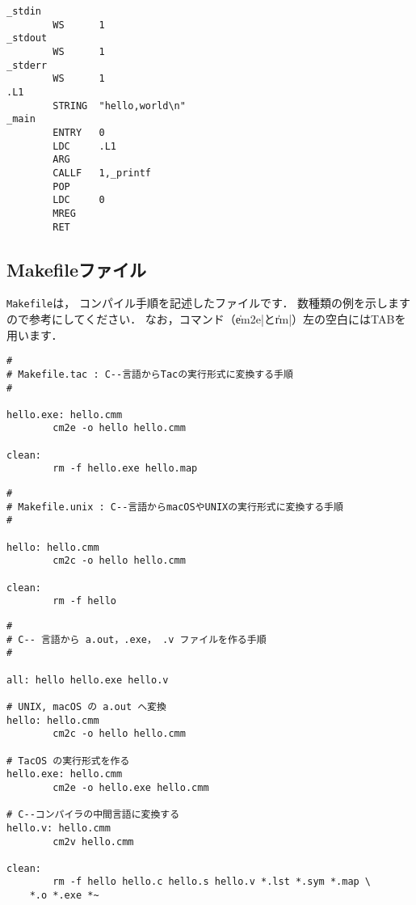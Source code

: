\begin{itemize}
\begin{mylist}
\begin{verbatim}
_stdin
        WS      1
_stdout
        WS      1
_stderr
        WS      1
.L1
        STRING  "hello,world\n"
_main
        ENTRY   0
        LDC     .L1
        ARG
        CALLF   1,_printf
        POP
        LDC     0
        MREG
        RET
\end{verbatim}
\end{mylist}
\end{itemize}

\subsection{Makefileファイル}

{\tt Makefile}は，
コンパイル手順を記述したファイルです．
数種類の例を示しますので参考にしてください．
なお，コマンド（\|em2e|と\|rm|）左の空白にはTABを用います．

\begin{mylist}
\begin{verbatim}
#
# Makefile.tac : C--言語からTacの実行形式に変換する手順
#

hello.exe: hello.cmm
        cm2e -o hello hello.cmm

clean:
        rm -f hello.exe hello.map
\end{verbatim}
\end{mylist}

\begin{mylist}
\begin{verbatim}
#
# Makefile.unix : C--言語からmacOSやUNIXの実行形式に変換する手順
#

hello: hello.cmm
        cm2c -o hello hello.cmm

clean:
        rm -f hello
\end{verbatim}
\end{mylist}

\begin{mylist}
\begin{verbatim}
#
# C-- 言語から a.out，.exe， .v ファイルを作る手順
#

all: hello hello.exe hello.v

# UNIX, macOS の a.out へ変換
hello: hello.cmm
        cm2c -o hello hello.cmm

# TacOS の実行形式を作る
hello.exe: hello.cmm
        cm2e -o hello.exe hello.cmm

# C--コンパイラの中間言語に変換する
hello.v: hello.cmm
        cm2v hello.cmm

clean:
        rm -f hello hello.c hello.s hello.v *.lst *.sym *.map \
	*.o *.exe *~

\end{verbatim}
\end{mylist}
